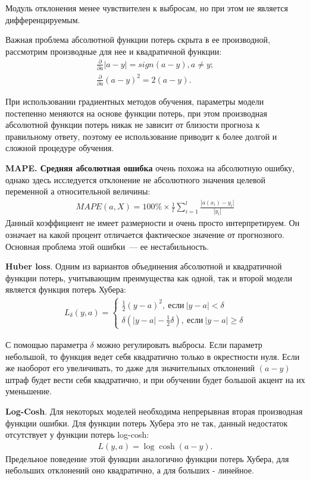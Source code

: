 \documentclass[12pt,a4paper]{article} %
\begin{document}
Модуль отклонения менее чувствителен к выбросам, но при этом не является дифференцируемым.

Важная проблема абсолютной функции потерь скрыта в ее производной, рассмотрим производные для нее и квадратичной функции:
\begin{gather}\label{linregdiff6}
	\frac{\partial}{\partial a}|a-y| = sign(a-y), a\not=y;\\
	\frac{\partial}{\partial a}(a-y)^2 = 2(a-y).
\end{gather}
 
При использовании градиентных методов обучения, параметры модели постепенно меняются на основе функции потерь, при этом производная абсолютной функции потерь никак не зависит от близости прогноза к правильному ответу, поэтому ее использование приводит к более долгой и сложной процедуре обучения.

\textbf{MAPE. Средняя абсолютная ошибка} очень похожа на абсолютную ошибку, однако здесь исследуется отклонение не абсолютного значения целевой переменной а относительной величины:
\begin{gather}\label{linregdiffMAPE}
	MAPE(a, X) = 100\% \times \frac{1}{l}\sum\limits_{i=1}^{l}\frac{|a(x_i)-y_i|}{|y_i|}
\end{gather}
Данный коэффициент не имеет размерности и очень просто интерпретируем. Он означает на какой процент отличается фактическое значение от прогнозного. Основная проблема этой ошибки~--- ее нестабильность.

\textbf{Huber loss}. Одним из вариантов объединения абсолютной и квадратичной функции потерь, учитывающим преимущества как одной, так и второй модели является функция потерь Хубера:
\begin{gather}\label{linregdiff7}
	L_{\delta}(y,a) = \begin{cases}
	\frac{1}{2}(y-a)^2,~\text{если}~|y-a|<\delta
		\\
	\delta\left(|y-a|-\frac{1}{2}\delta\right),~\text{если}~|y-a|\geq\delta
	\end{cases}
\end{gather}

С помощью параметра $\delta$ можно регулировать выбросы. Если параметр небольшой, то функция ведет себя квадратично только в окрестности нуля. Если же наоборот его увеличивать, то даже для значительных отклонений $(a-y)$ штраф будет вести себя квадратично, и при обучении будет большой акцент на их уменьшение.

\textbf{Log-Cosh}. Для некоторых моделей необходима непрерывная вторая производная функции ошибки. Для функции потерь Хубера это не так, данный недостаток отсутствует у функции потерь log-cosh:
 \begin{gather}\label{linregdiff8}
 L(y,a) = \log\cosh(a-y).
 \end{gather}
Предельное поведение этой функции аналогично функции потерь Хубера, для небольших отклонений оно квадратично, а для больших - линейное.
\end{document}

